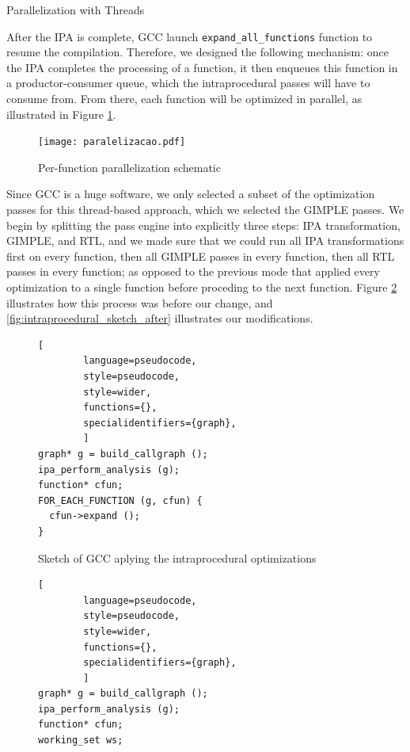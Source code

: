 \begin{section}{Parallelization with Threads}

After the IPA is complete, GCC launch \texttt{expand\_all\_functions} function
to resume the compilation. Therefore, we designed the following mechanism: once
the IPA completes the processing of a function, it then enqueues this function
in a productor-consumer queue, which the intraprocedural passes will have to
consume from. From there, each function will be optimized in parallel, as
illustrated in Figure \ref{fig:paralelizacao}.


\begin{figure}[ht]
 \centering
 \texttt{[image: paralelizacao.pdf]}
 \caption{Per-function parallelization schematic}
 \label{fig:paralelizacao}
\end{figure}

Since GCC is a huge software, we only selected a subset of the optimization
passes for this thread-based approach, which we selected the GIMPLE passes.
We begin by splitting the pass engine into explicitly three steps: IPA transformation,
GIMPLE, and RTL, and we made sure that we could run all IPA transformations first on
every function, then all GIMPLE passes in every function, then all RTL passes in
every function; as opposed to the previous mode that applied every optimization
to a single function before proceding to the next function. Figure
\ref{fig:intraprocedural_sketch} illustrates how this process was before our
change, and \ref{fig:intraprocedural_sketch_after} illustrates our modifications.

\begin{figure}[ht]
	\centering
	\begin{lstlisting}[
		language=pseudocode,
		style=pseudocode,
		style=wider,
		functions={},
		specialidentifiers={graph},
		]
graph* g = build_callgraph ();
ipa_perform_analysis (g);
function* cfun;
FOR_EACH_FUNCTION (g, cfun) {
  cfun->expand ();
}
	\end{lstlisting}
\caption{Sketch of GCC aplying the intraprocedural optimizations}
\label{fig:intraprocedural_sketch}
\end{figure}


\begin{figure}[ht]
	\begin{center}
	\begin{lstlisting}[
		language=pseudocode,
		style=pseudocode,
		style=wider,
		functions={},
		specialidentifiers={graph},
		]
graph* g = build_callgraph ();
ipa_perform_analysis (g);
function* cfun;
working_set ws;


\end{lstlisting}
\end{center}
\end{figure}
\end{section}
